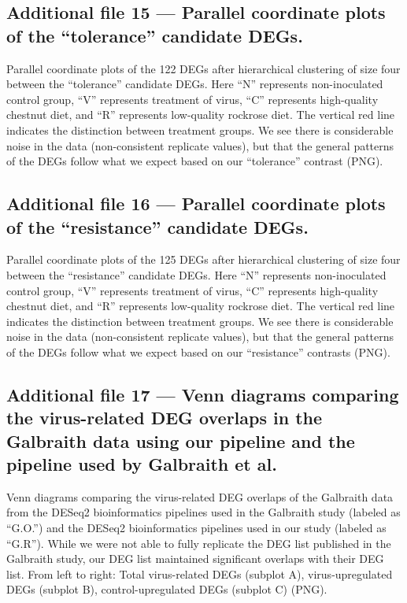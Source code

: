 \documentclass{bmcart}
\begin{document}
\begin{linenumbers}
\begin{backmatter}
   \subsection*{Additional file 15 --- Parallel coordinate plots of the ``tolerance'' candidate DEGs.}    
    Parallel coordinate plots of the 122 DEGs after hierarchical clustering of size four between the ``tolerance'' candidate DEGs. Here ``N'' represents non-inoculated control group, ``V'' represents treatment of virus, ``C'' represents high-quality chestnut diet, and ``R'' represents low-quality rockrose diet. The vertical red line indicates the distinction between treatment groups. We see there is considerable noise in the data (non-consistent replicate values), but that the general patterns of the DEGs follow what we expect based on our ``tolerance'' contrast (PNG).
    
   \subsection*{Additional file 16 --- Parallel coordinate plots of the ``resistance'' candidate DEGs.}    
    Parallel coordinate plots of the 125 DEGs after hierarchical clustering of size four between the ``resistance'' candidate DEGs. Here ``N'' represents non-inoculated control group, ``V'' represents treatment of virus, ``C'' represents high-quality chestnut diet, and ``R'' represents low-quality rockrose diet. The vertical red line indicates the distinction between treatment groups. We see there is considerable noise in the data (non-consistent replicate values), but that the general patterns of the DEGs follow what we expect based on our ``resistance'' contrasts (PNG).

   \subsection*{Additional file 17 --- Venn diagrams comparing the virus-related DEG overlaps in the Galbraith data using our pipeline and the pipeline used by Galbraith et al.}
  Venn diagrams comparing the virus-related DEG overlaps of the Galbraith data from the DESeq2 bioinformatics pipelines used in the Galbraith study (labeled as ``G.O.'') and the DESeq2 bioinformatics pipelines used in our study (labeled as ``G.R''). While we were not able to fully replicate the DEG list published in the Galbraith study, our DEG list maintained significant overlaps with their DEG list. From left to right: Total virus-related DEGs (subplot A), virus-upregulated DEGs (subplot B), control-upregulated DEGs (subplot C) (PNG).
    

\end{backmatter}
\end{linenumbers}
\end{document}
